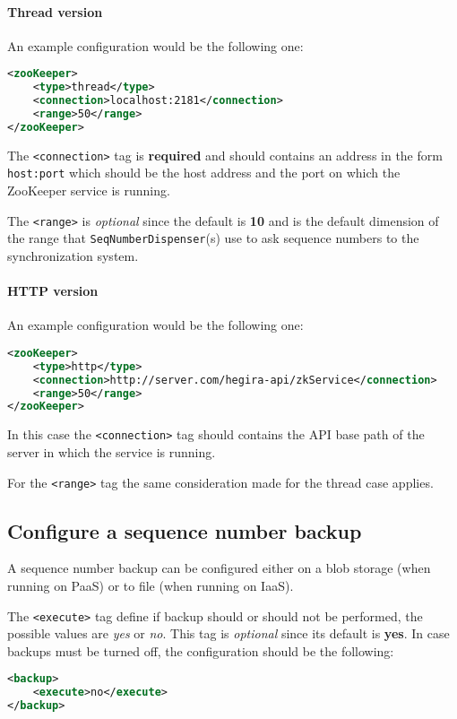 \paragraph{Thread version} An example configuration would be the following one:
\begin{lstlisting}[language=XML, caption=ZooKeeper - thread type configuration]
<zooKeeper>
    <type>thread</type>
    <connection>localhost:2181</connection>
    <range>50</range>
</zooKeeper>
\end{lstlisting}

\noindent The \texttt{<connection>} tag is \textbf{required} and should contains an address in the form \texttt{host:port} which should be the host address and the port on which the ZooKeeper service is running.

\noindent The \texttt{<range>} is \textit{optional} since the default is \textbf{10} and is the default dimension of the range that \texttt{SeqNumberDispenser}(s) use to ask sequence numbers to the synchronization system.

\paragraph{HTTP version} An example configuration would be the following one:
\begin{lstlisting}[language=XML, caption=ZooKeeper - http type configuration]
<zooKeeper>
    <type>http</type>
    <connection>http://server.com/hegira-api/zkService</connection>
    <range>50</range>
</zooKeeper>
\end{lstlisting}

\noindent In this case the \texttt{<connection>} tag should contains the API base path of the server in which the service is running.

\noindent For the \texttt{<range>} tag the same consideration made for the thread case applies.
 
\subsection{Configure a sequence number backup}
A sequence number backup can be configured either on a blob storage (when running on PaaS) or to file (when running on IaaS).

\newparagraph  The \texttt{<execute>} tag define if backup should or should not be performed, the possible values are \textit{yes} or \textit{no}. This tag is \textit{optional} since its default is \textbf{yes}.
In case backups must be turned off, the configuration should be the following:
\begin{lstlisting}[language=XML, caption=Turning off sequence numbers backup]
<backup>
    <execute>no</execute>
</backup>
\end{lstlisting}

